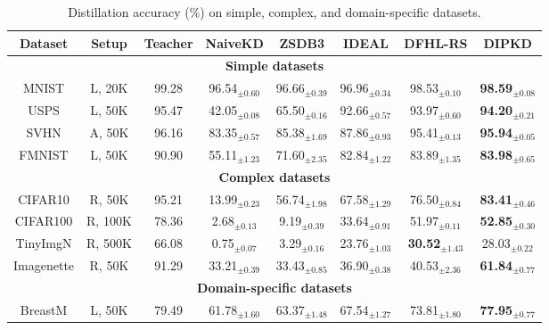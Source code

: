 \begin{table}[ht]
    \caption{Distillation accuracy (\%) on simple, complex, and domain-specific datasets.}
    \centering
    \begin{tabular}{c|c|c|c|c|c|c|c}
        \hline \textbf{Dataset} & \textbf{Setup} & \textbf{Teacher} & \textbf{NaiveKD} & \textbf{ZSDB3} & \textbf{IDEAL} & \textbf{DFHL-RS} & \textbf{DIPKD} \\
        \hline \multicolumn{8}{c}{\textbf{Simple datasets}} \\
        \hline
        MNIST    & L, 20K  & 99.28 & 96.54$_{\pm 0.60}$           & 96.66$_{\pm 0.39}$           & 96.96$_{\pm 0.34}$ & 98.53$_{\pm 0.10}$          & \textbf{98.59}$_{\pm 0.08}$ \\
        USPS     & L, 50K  & 95.47 & 42.05$_{\pm 0.08}$           & 65.50$_{\pm 0.16}$           & 92.66$_{\pm 0.57}$ & 93.97$_{\pm 0.60}$          & \textbf{94.20}$_{\pm 0.21}$ \\
        SVHN     & A, 50K  & 96.16 & 83.35$_{\pm 0.57}$           & 85.38$_{\pm 1.69}$           & 87.86$_{\pm 0.93}$ & 95.41$_{\pm 0.13}$          & \textbf{95.94}$_{\pm 0.05}$ \\
        FMNIST   & L, 50K  & 90.90 & 55.11$_{\pm 1.23}$           & 71.60$_{\pm 2.35}$           & 82.84$_{\pm 1.22}$ & 83.89$_{\pm 1.35}$          & \textbf{83.98}$_{\pm 0.65}$ \\
        \hline \multicolumn{8}{c}{\textbf{Complex datasets}} \\
        \hline
        CIFAR10  & R, 50K  & 95.21 & 13.99$_{\pm 0.23}$           & 56.74$_{\pm 1.98}$           & 67.58$_{\pm 1.29}$ & 76.50$_{\pm 0.84}$          & \textbf{83.41}$_{\pm 0.46}$ \\
        CIFAR100 & R, 100K & 78.36 & \phantom{0}2.68$_{\pm 0.13}$ & \phantom{0}9.19$_{\pm 0.39}$ & 33.64$_{\pm 0.91}$ & 51.97$_{\pm 0.11}$          & \textbf{52.85}$_{\pm 0.30}$ \\
        TinyImgN & R, 500K & 66.08 & \phantom{0}0.75$_{\pm 0.07}$ & \phantom{0}3.29$_{\pm 0.16}$ & 23.76$_{\pm 1.03}$ & \textbf{30.52}$_{\pm 1.43}$ & 28.03$_{\pm 0.22}$ \\
        Imagenette & R, 50K  & 91.29 & 33.21$_{\pm 0.39}$         & 33.43$_{\pm 0.85}$           & 36.90$_{\pm 0.38}$ & 40.53$_{\pm 2.36}$          & \textbf{61.84}$_{\pm 0.77}$ \\
        \hline \multicolumn{8}{c}{\textbf{Domain-specific datasets}} \\
        \hline
        BreastM  & L, 50K  & 79.49 & 61.78$_{\pm 1.60}$           & 63.37$_{\pm 1.48}$           & 67.54$_{\pm 1.27}$ & 73.81$_{\pm 1.80}$          & \textbf{77.95}$_{\pm 0.77}$ \\

\end{tabular}
\end{table}
